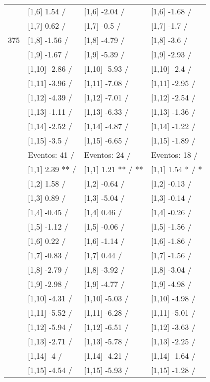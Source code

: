 \begin{table}
\begin{tabular}[t]{llll}
 & {}[1,6] 1.54  / & {}[1,6] -2.04  / & {}[1,6] -1.68  /\\
 & {}[1,7] 0.62  / & {}[1,7] -0.5  / & {}[1,7] -1.7  /\\
375 & {}[1,8] -1.56  / & {}[1,8] -4.79  / & {}[1,8] -3.6  /\\
\addlinespace
 & {}[1,9] -1.67  / & {}[1,9] -5.39  / & {}[1,9] -2.93  /\\
 & {}[1,10] -2.86  / & {}[1,10] -5.93  / & {}[1,10] -2.4  /\\
 & {}[1,11] -3.96  / & {}[1,11] -7.08  / & {}[1,11] -2.95  /\\
 & {}[1,12] -4.39  / & {}[1,12] -7.01  / & {}[1,12] -2.54  /\\
 & {}[1,13] -1.11  / & {}[1,13] -6.33  / & {}[1,13] -1.36  /\\
\addlinespace
 & {}[1,14] -2.52  / & {}[1,14] -4.87  / & {}[1,14] -1.22  /\\
 & {}[1,15] -3.5  / & {}[1,15] -6.65  / & {}[1,15] -1.89  /\\
 & Eventos:  41 / & Eventos:  24 / & Eventos:  18 /\\
 & {}[1,1] 2.39 ** / & {}[1,1] 1.21 ** / ** & {}[1,1] 1.54 * / *\\
 & {}[1,2] 1.58  / & {}[1,2] -0.64  / & {}[1,2] -0.13  /\\
\addlinespace
 & {}[1,3] 0.89  / & {}[1,3] -5.04  / & {}[1,3] -0.14  /\\
 & {}[1,4] -0.45  / & {}[1,4] 0.46  / & {}[1,4] -0.26  /\\
 & {}[1,5] -1.12  / & {}[1,5] -0.06  / & {}[1,5] -1.56  /\\
 & {}[1,6] 0.22  / & {}[1,6] -1.14  / & {}[1,6] -1.86  /\\
 & {}[1,7] -0.83  / & {}[1,7] 0.44  / & {}[1,7] -1.56  /\\
\addlinespace
500 & {}[1,8] -2.79  / & {}[1,8] -3.92  / & {}[1,8] -3.04  /\\
 & {}[1,9] -2.98  / & {}[1,9] -4.77  / & {}[1,9] -4.98  /\\
 & {}[1,10] -4.31  / & {}[1,10] -5.03  / & {}[1,10] -4.98  /\\
 & {}[1,11] -5.52  / & {}[1,11] -6.28  / & {}[1,11] -5.01  /\\
 & {}[1,12] -5.94  / & {}[1,12] -6.51  / & {}[1,12] -3.63  /\\
\addlinespace
 & {}[1,13] -2.71  / & {}[1,13] -5.78  / & {}[1,13] -2.25  /\\
 & {}[1,14] -4  / & {}[1,14] -4.21  / & {}[1,14] -1.64  /\\
 & {}[1,15] -4.54  / & {}[1,15] -5.93  / & {}[1,15] -1.28  /\\
\bottomrule
\end{tabular}
\end{table}
